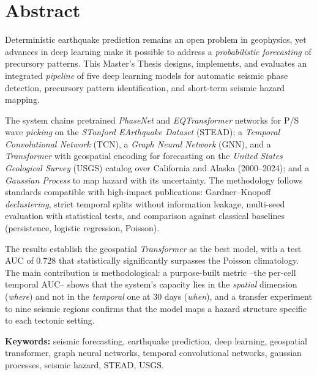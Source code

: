 \cleardoublepage

\chapter*{Abstract}
\label{abstract}

Deterministic earthquake prediction remains an open problem in geophysics, yet advances in deep learning make it possible to address a \emph{probabilistic forecasting} of precursory patterns. This Master's Thesis designs, implements, and evaluates an integrated \emph{pipeline} of five deep learning models for automatic seismic phase detection, precursory pattern identification, and short-term seismic hazard mapping.

The system chains pretrained \textit{PhaseNet} and \textit{EQTransformer} networks for P/S wave \textit{picking} on the \textit{STanford EArthquake Dataset} (STEAD); a \textit{Temporal Convolutional Network} (TCN), a \textit{Graph Neural Network} (GNN), and a \textit{Transformer} with geospatial encoding for forecasting on the \textit{United States Geological Survey} (USGS) catalog over California and Alaska (2000--2024); and a \textit{Gaussian Process} to map hazard with its uncertainty. The methodology follows standards compatible with high-impact publications: Gardner--Knopoff \textit{declustering}, strict temporal splits without information leakage, multi-seed evaluation with statistical tests, and comparison against classical baselines (persistence, logistic regression, Poisson).

The results establish the geospatial \textit{Transformer} as the best model, with a test AUC of \(0.728\) that statistically significantly surpasses the Poisson climatology. The main contribution is methodological: a purpose-built metric --the per-cell temporal AUC-- shows that the system's capacity lies in the \emph{spatial} dimension (\emph{where}) and not in the \emph{temporal} one at 30 days (\emph{when}), and a transfer experiment to nine seismic regions confirms that the model maps a hazard structure specific to each tectonic setting.

\medskip
\noindent\textbf{Keywords:} seismic forecasting, earthquake prediction, deep learning, geospatial transformer, graph neural networks, temporal convolutional networks, gaussian processes, seismic hazard, STEAD, USGS.
